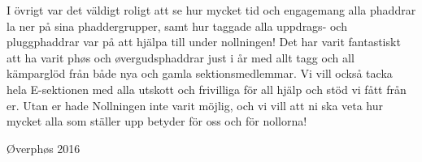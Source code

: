 \documentclass[../_main/handlingar.tex]{subfiles}
\begin{document}
I övrigt var det väldigt roligt att se hur mycket tid och engagemang alla phaddrar la ner på sina phaddergrupper, samt hur taggade alla uppdrags- och pluggphaddrar var på att hjälpa till under nollningen! Det har varit fantastiskt att ha varit phøs och øvergudsphaddrar just i år med allt tagg och all kämparglöd från både nya och gamla sektionsmedlemmar. Vi vill också tacka hela E-sektionen med alla utskott och frivilliga för all hjälp och stöd vi fått från er. Utan er hade Nollningen inte varit möjlig, och vi vill att ni ska veta hur mycket alla som ställer upp betyder för oss och för nollorna!
\begin{signatures}{1}
    \mvh
    \signature{Molly Rusk}{Øverphøs 2016}
\end{signatures}
\end{document}
